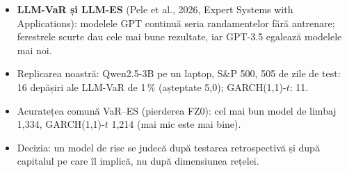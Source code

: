 \begin{itemize}\setlength{\itemsep}{2pt}
  \item \textbf{LLM-VaR și LLM-ES} (Pele et al., 2026, Expert Systems with Applications): modelele GPT continuă seria randamentelor fără antrenare; ferestrele scurte dau cele mai bune rezultate, iar GPT-3.5 egalează modelele mai noi.
  \item Replicarea noastră: Qwen2.5-3B pe un laptop, S\&P 500, 505 de zile de test: 16 depășiri ale LLM-VaR de 1\,\% (așteptate 5,0); GARCH(1,1)-$t$: 11.
  \item Acuratețea comună VaR--ES (pierderea FZ0): cel mai bun model de limbaj 1,334, GARCH(1,1)-$t$ 1,214 (mai mic este mai bine).
  \item Decizia: un model de risc se judecă după testarea retrospectivă și după capitalul pe care îl implică, nu după dimensiunea rețelei.
\end{itemize}
